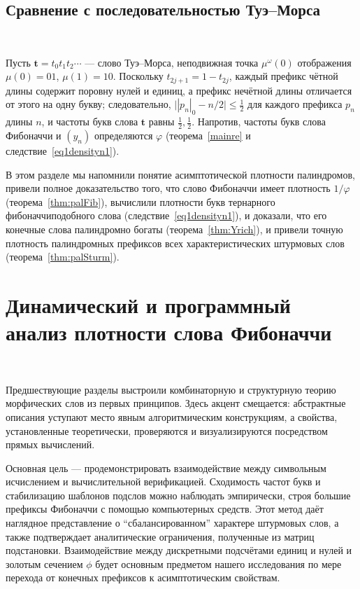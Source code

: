 \documentclass[a4paper,14pt]{extreport}
\theoremstyle{plain}
\theoremstyle{definition}
\theoremstyle{remark}
\begin{document}
\subsection{Сравнение с последовательностью Туэ--Морса}~\label{sec3.6.4}

Пусть $\mathbf t=t_0t_1t_2\cdots$ --- слово Туэ--Морса, неподвижная точка $\mu^\omega(0)$ отображения $\mu(0)=01$, $\mu(1)=10$.
Поскольку $t_{2j+1}=1-t_{2j}$, каждый префикс чётной длины содержит поровну нулей и единиц, а префикс нечётной длины
отличается от этого на одну букву; следовательно, $\bigl||p_n|_0-n/2\bigr|\le\tfrac12$ для каждого префикса $p_n$ длины $n$, и частоты букв
слова $\mathbf t$ равны $\tfrac12,\tfrac12$. Напротив, частоты букв слова Фибоначчи и $(y_n)$
определяются $\varphi$ (теорема~\ref{mainre} и следствие~\ref{eq1densityn1}).

В этом разделе мы напомнили понятие асимптотической плотности палиндромов, привели полное доказательство того, что слово Фибоначчи имеет плотность
$1/\varphi$ (теорема~\ref{thm:palFib}), вычислили плотности букв тернарного фибоначчиподобного слова (следствие~\ref{eq1densityn1}), и доказали, что его конечные слова палиндромно богаты (теорема~\ref{thm:Yrich}), и привели точную плотность палиндромных префиксов всех характеристических штурмовых слов (теорема~\ref{thm:palSturm}).
\section{Динамический и программный анализ плотности слова Фибоначчи}~\label{sec3.7}

Предшествующие разделы выстроили комбинаторную и структурную теорию морфических слов из первых принципов. Здесь акцент смещается: абстрактные  описания уступают место явным алгоритмическим конструкциям, а свойства, установленные теоретически, проверяются и визуализируются посредством прямых вычислений.

Основная цель --- продемонстрировать взаимодействие между символьным исчислением и вычислительной верификацией. Сходимость частот букв и стабилизацию шаблонов подслов можно наблюдать эмпирически, строя большие префиксы Фибоначчи с помощью компьютерных средств. Этот метод даёт наглядное представление о ``сбалансированном'' характере штурмовых слов, а также подтверждает аналитические ограничения, полученные из матриц подстановки. Взаимодействие между дискретными подсчётами единиц и нулей и золотым сечением $\phi$ будет основным предметом нашего исследования по мере перехода от конечных префиксов к асимптотическим свойствам.
\end{document}

